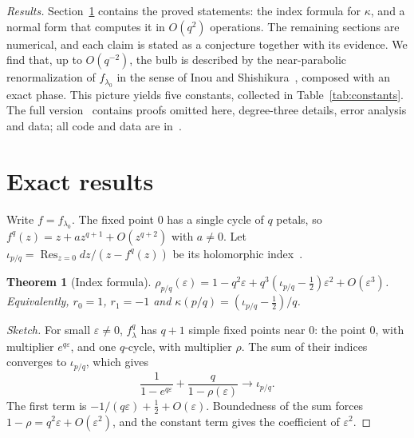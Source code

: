 \documentclass[11pt]{amsart}
\newtheorem{theorem}{Theorem}[section]
\theoremstyle{definition}
\theoremstyle{remark}
\newcommand{\Res}{\operatorname*{Res}}
\begin{document}
\emph{Results.} Section~\ref{sec:exact} contains the proved statements: the index formula for $\kappa$, and a normal form that computes it in $O(q^2)$ operations. The remaining sections are numerical, and each claim is stated as a conjecture together with its evidence. We find that, up to $O(q^{-2})$, the bulb is described by the near-parabolic renormalization of $f_{\lambda_0}$ in the sense of Inou and Shishikura~\cite{IS}, composed with an exact phase. This picture yields five constants, collected in Table~\ref{tab:constants}. The full version~\cite{full} contains proofs omitted here, degree-three details, error analysis and data; all code and data are in~\cite{repo}.

\begin{table}[t]
\centering\footnotesize

\caption{The constants. ``Bulbs'' is the difference between the horn-map value and the best extrapolated bulb limit ($\kappa_0^{(3)}$: error at $q=1024$, decaying like $q^{-2}$). The extrapolation uncertainties are about $3\cdot10^{-25}$ for $\kappa_0$, $2\cdot10^{-7}$ for $\kappa^+_{1/2}$ and $10^{-6}$ for $G_0$.}\label{tab:constants}
\end{table}

\section{Exact results}\label{sec:exact}
Write $f=f_{\lambda_0}$. The fixed point $0$ has a single cycle of $q$ petals, so $f^q(z)=z+az^{q+1}+O(z^{q+2})$ with $a\ne0$. Let $\iota_{p/q}=\Res_{z=0}dz/(z-f^q(z))$ be its holomorphic index~\cite{Milnor}.

\begin{theorem}[Index formula]\label{thm:index}
$\rho_{p/q}(\varepsilon)=1-q^2\varepsilon+q^3(\iota_{p/q}-\frac12)\varepsilon^2+O(\varepsilon^3)$. Equivalently, $r_0=1$, $r_1=-1$ and $\kappa(p/q)=(\iota_{p/q}-\frac12)/q$.
\end{theorem}

\begin{proof}[Sketch]
For small $\varepsilon\ne0$, $f^q_\lambda$ has $q+1$ simple fixed points near $0$: the point $0$, with multiplier $e^{q\varepsilon}$, and one $q$-cycle, with multiplier $\rho$. The sum of their indices converges to $\iota_{p/q}$, which gives
\[
\frac1{1-e^{q\varepsilon}}+\frac q{1-\rho(\varepsilon)}\longrightarrow\iota_{p/q}.
\]
The first term is $-1/(q\varepsilon)+\frac12+O(\varepsilon)$. Boundedness of the sum forces $1-\rho=q^2\varepsilon+O(\varepsilon^2)$, and the constant term gives the coefficient of $\varepsilon^2$.
\end{proof}
\end{document}
